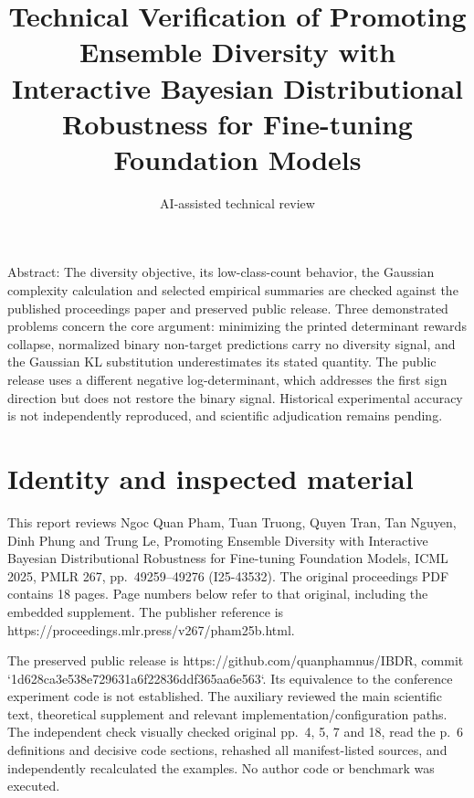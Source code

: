 \documentclass[10pt]{article}
\title{Technical Verification of Promoting Ensemble Diversity with Interactive Bayesian Distributional Robustness for Fine-tuning Foundation Models}
\author{AI-assisted technical review}
\date{}
\begin{document}
\maketitle
Abstract: The diversity objective, its low-class-count behavior, the Gaussian complexity calculation and selected empirical summaries are checked against the published proceedings paper and preserved public release. Three demonstrated problems concern the core argument: minimizing the printed determinant rewards collapse, normalized binary non-target predictions carry no diversity signal, and the Gaussian KL substitution underestimates its stated quantity. The public release uses a different negative log-determinant, which addresses the first sign direction but does not restore the binary signal. Historical experimental accuracy is not independently reproduced, and scientific adjudication remains pending.\par
\section*{Identity and inspected material}
This report reviews Ngoc Quan Pham, Tuan Truong, Quyen Tran, Tan Nguyen, Dinh Phung and Trung Le, Promoting Ensemble Diversity with Interactive Bayesian Distributional Robustness for Fine-tuning Foundation Models, ICML 2025, PMLR 267, pp. 49259–49276 (I25-43532). The original proceedings PDF contains 18 pages. Page numbers below refer to that original, including the embedded supplement. The publisher reference is https://proceedings.mlr.press/v267/pham25b.html.\par
The preserved public release is https://github.com/quanphamnus/IBDR, commit `1d628ca3e538e729631a6f22836ddf365aa6e563`. Its equivalence to the conference experiment code is not established. The auxiliary reviewed the main scientific text, theoretical supplement and relevant implementation/configuration paths. The independent check visually checked original pp. 4, 5, 7 and 18, read the p. 6 definitions and decisive code sections, rehashed all manifest-listed sources, and independently recalculated the examples. No author code or benchmark was executed.\par
\end{document}
